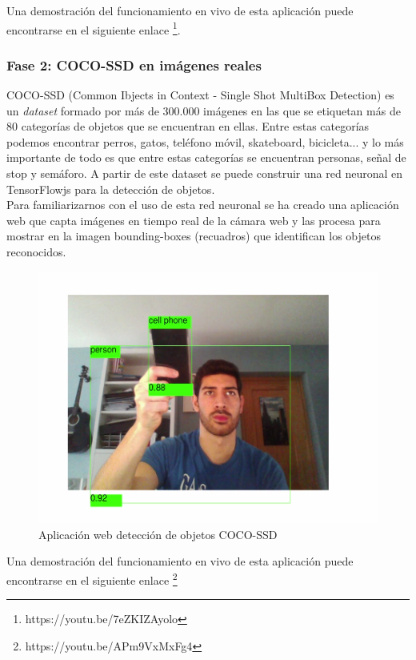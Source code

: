 \documentclass{report}
\begin{document}
Una demostración del funcionamiento en vivo de esta aplicación puede encontrarse en el siguiente enlace \footnote{https://youtu.be/7eZKIZAyolo}.

\subsubsection{Fase 2: COCO-SSD en imágenes reales}
COCO-SSD (Common Ibjects in Context - Single Shot MultiBox Detection) es un \textit{dataset} formado por más de 300.000 imágenes en las que se etiquetan más de 80 categorías de objetos que se encuentran en ellas. Entre estas categorías podemos encontrar perros, gatos, teléfono móvil, skateboard, bicicleta... y lo más importante de todo es que entre estas categorías se encuentran personas, señal de stop y semáforo. A partir de este dataset se puede construir una red neuronal en TensorFlowjs para la detección de objetos.
\\

Para familiarizarnos con el uso de esta red neuronal se ha creado una aplicación web que capta imágenes en tiempo real de la cámara web y las procesa para mostrar en la imagen bounding-boxes (recuadros) que identifican los objetos reconocidos.

\renewcommand{\figurename}{Figura}		
\begin{figure}[h]
	\centering
	 \includegraphics[scale=0.32]{images/cap4/coco.png}
	 \caption{Aplicación web detección de objetos COCO-SSD}
\end{figure}

Una demostración del funcionamiento en vivo de esta aplicación puede encontrarse en el siguiente enlace \footnote{https://youtu.be/APm9VxMxFg4}
\end{document}
